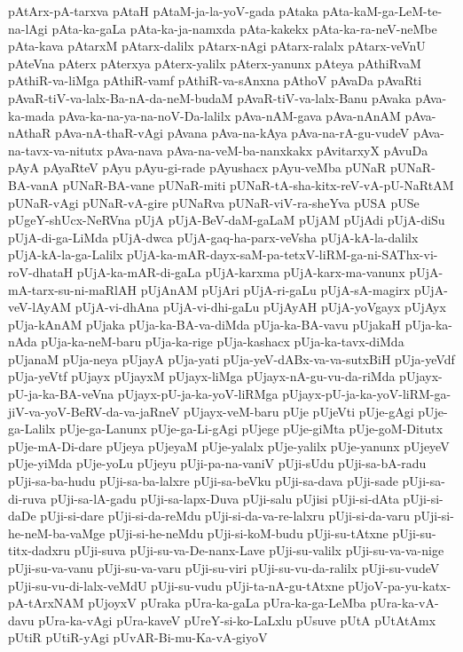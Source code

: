 {pAtArx-pA-tarxva
pAtaH
pAtaM-ja-la-yoV-gada
pAtaka
pAta-kaM-ga-LeM-te-na-lAgi
pAta-ka-gaLa
pAta-ka-ja-namxda
pAta-kakekx
pAta-ka-ra-neV-neMbe
pAta-kava
pAtarxM
pAtarx-dalilx
pAtarx-nAgi
pAtarx-ralalx
pAtarx-veVnU
pAteVna
pAterx
pAterxya
pAterx-yalilx
pAterx-yanunx
pAteya
pAthiRvaM
pAthiR-va-liMga
pAthiR-vamf
pAthiR-va-sAnxna
pAthoV
pAvaDa
pAvaRti
pAvaR-tiV-va-lalx-Ba-nA-da-neM-budaM
pAvaR-tiV-va-lalx-Banu
pAvaka
pAva-ka-mada
pAva-ka-na-ya-na-noV-Da-lalilx
pAva-nAM-gava
pAva-nAnAM
pAva-nAthaR
pAva-nA-thaR-vAgi
pAvana
pAva-na-kAya
pAva-na-rA-gu-vudeV
pAva-na-tavx-va-nitutx
pAva-nava
pAva-na-veM-ba-nanxkakx
pAvitarxyX
pAvuDa
pAyA
pAyaRteV
pAyu
pAyu-gi-rade
pAyushacx
pAyu-veMba
pUNaR
pUNaR-BA-vanA
pUNaR-BA-vane
pUNaR-miti
pUNaR-tA-sha-kitx-reV-vA-pU-NaRtAM
pUNaR-vAgi
pUNaR-vA-gire
pUNaRva
pUNaR-viV-ra-sheYva
pUSA
pUSe
pUgeY-shUcx-NeRVna
pUjA
pUjA-BeV-daM-gaLaM
pUjAM
pUjAdi
pUjA-diSu
pUjA-di-ga-LiMda
pUjA-dwca
pUjA-gaq-ha-parx-veVsha
pUjA-kA-la-dalilx
pUjA-kA-la-ga-Lalilx
pUjA-ka-mAR-dayx-saM-pa-tetxV-liRM-ga-ni-SAThx-vi-roV-dhataH
pUjA-ka-mAR-di-gaLa
pUjA-karxma
pUjA-karx-ma-vanunx
pUjA-mA-tarx-su-ni-maRlAH
pUjAnAM
pUjAri
pUjA-ri-gaLu
pUjA-sA-magirx
pUjA-veV-lAyAM
pUjA-vi-dhAna
pUjA-vi-dhi-gaLu
pUjAyAH
pUjA-yoVgayx
pUjAyx
pUja-kAnAM
pUjaka
pUja-ka-BA-va-diMda
pUja-ka-BA-vavu
pUjakaH
pUja-ka-nAda
pUja-ka-neM-baru
pUja-ka-rige
pUja-kashacx
pUja-ka-tavx-diMda
pUjanaM
pUja-neya
pUjayA
pUja-yati
pUja-yeV-dABx-va-va-sutxBiH
pUja-yeVdf
pUja-yeVtf
pUjayx
pUjayxM
pUjayx-liMga
pUjayx-nA-gu-vu-da-riMda
pUjayx-pU-ja-ka-BA-veVna
pUjayx-pU-ja-ka-yoV-liRMga
pUjayx-pU-ja-ka-yoV-liRM-ga-jiV-va-yoV-BeRV-da-va-jaRneV
pUjayx-veM-baru
pUje
pUjeVti
pUje-gAgi
pUje-ga-Lalilx
pUje-ga-Lanunx
pUje-ga-Li-gAgi
pUjege
pUje-giMta
pUje-goM-Ditutx
pUje-mA-Di-dare
pUjeya
pUjeyaM
pUje-yalalx
pUje-yalilx
pUje-yanunx
pUjeyeV
pUje-yiMda
pUje-yoLu
pUjeyu
pUji-pa-na-vaniV
pUji-sUdu
pUji-sa-bA-radu
pUji-sa-ba-hudu
pUji-sa-ba-lalxre
pUji-sa-beVku
pUji-sa-dava
pUji-sade
pUji-sa-di-ruva
pUji-sa-lA-gadu
pUji-sa-lapx-Duva
pUji-salu
pUjisi
pUji-si-dAta
pUji-si-daDe
pUji-si-dare
pUji-si-da-reMdu
pUji-si-da-va-re-lalxru
pUji-si-da-varu
pUji-si-he-neM-ba-vaMge
pUji-si-he-neMdu
pUji-si-koM-budu
pUji-su-tAtxne
pUji-su-titx-dadxru
pUji-suva
pUji-su-va-De-nanx-Lave
pUji-su-valilx
pUji-su-va-va-nige
pUji-su-va-vanu
pUji-su-va-varu
pUji-su-viri
pUji-su-vu-da-ralilx
pUji-su-vudeV
pUji-su-vu-di-lalx-veMdU
pUji-su-vudu
pUji-ta-nA-gu-tAtxne
pUjoV-pa-yu-katx-pA-tArxNAM
pUjoyxV
pUraka
pUra-ka-gaLa
pUra-ka-ga-LeMba
pUra-ka-vA-davu
pUra-ka-vAgi
pUra-kaveV
pUreY-si-ko-LaLxlu
pUsuve
pUtA
pUtAtAmx
pUtiR
pUtiR-yAgi
pUvAR-Bi-mu-Ka-vA-giyoV
}
